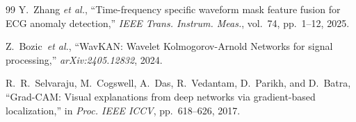 \documentclass[journal,10pt]{IEEEtran}
\newcommand{\etal}{\textit{et al.}}
\begin{document}
\begin{thebibliography}{99}
Y.~Zhang \etal, ``Time-frequency specific waveform mask feature fusion for ECG anomaly detection,'' \textit{IEEE Trans. Instrum. Meas.}, vol.~74, pp.~1--12, 2025.

Z.~Bozic~\etal, ``WavKAN: Wavelet Kolmogorov-Arnold Networks for signal processing,'' \textit{arXiv:2405.12832}, 2024.

R.~R.~Selvaraju, M.~Cogswell, A.~Das, R.~Vedantam, D.~Parikh, and D.~Batra, ``Grad-CAM: Visual explanations from deep networks via gradient-based localization,'' in \textit{Proc. IEEE ICCV}, pp.~618--626, 2017.

\end{thebibliography}
\end{document}
